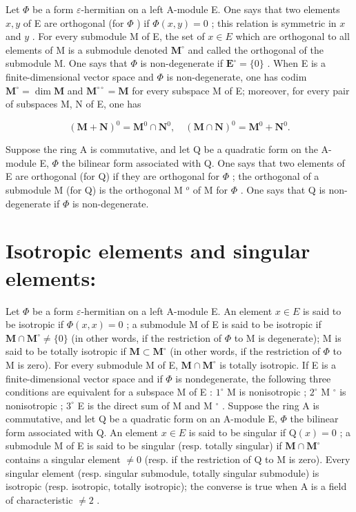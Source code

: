 Let \(\Phi\) be a form \(\varepsilon\)-hermitian on a left A-module E. One says that two elements \(x, y\) of E are orthogonal (for \(\Phi\) ) if \(\Phi(x, y) = 0\) ; this relation is symmetric in \(x\) and \(y\) . For every submodule M of E, the set of \(x \in E\) which are orthogonal to all elements of M is a submodule denoted \(\mathbf{M}^{\circ}\) and called the orthogonal of the submodule M. One says that \(\Phi\) is non-degenerate if \(\mathbf{E}^{\circ} = \{0\}\) . When E is a finite-dimensional vector space and \(\Phi\) is non-degenerate, one has codim \(\mathbf{M}^{\circ} = \dim \mathbf{M}\) and \(\mathbf{M}^{\circ\circ} = \mathbf{M}\) for every subspace M of E; moreover, for every pair of subspaces M, N of E, one has

\[
(\mathbf {M} + \mathbf {N}) ^ {0} = \mathbf {M} ^ {0} \cap \mathbf {N} ^ {0}, \quad (\mathbf {M} \cap \mathbf {N}) ^ {0} = \mathbf {M} ^ {0} + \mathbf {N} ^ {0}.
\]

Suppose the ring A is commutative, and let Q be a quadratic form on the A-module E, \(\Phi\) the bilinear form associated with Q. One says that two elements of E are orthogonal (for Q) if they are orthogonal for \(\Phi\) ; the orthogonal of a submodule M (for Q) is the orthogonal M \(^{o}\) of M for \(\Phi\) . One says that Q is non-degenerate if \(\Phi\) is non-degenerate.

\section*{Isotropic elements and singular elements:}

Let \(\Phi\) be a form \(\varepsilon\)-hermitian on a left A-module E. An element \(x \in E\) is said to be isotropic if \(\Phi(x, x) = 0\) ; a submodule M of E is said to be isotropic if \(\mathbf{M} \cap \mathbf{M}^{\circ} \neq \{0\}\) (in other words, if the restriction of \(\Phi\) to M is degenerate); M is said to be totally isotropic if \(\mathbf{M} \subset \mathbf{M}^{\circ}\) (in other words, if the restriction of \(\Phi\) to M is zero). For every submodule M of E, \(\mathbf{M} \cap \mathbf{M}^{\circ}\) is totally isotropic. If E is a finite-dimensional vector space and if \(\Phi\) is nondegenerate, the following three conditions are equivalent for a subspace M of E : \(1^{\circ}\) M is nonisotropic ; \(2^{\circ}\) M \(^{\circ}\) is nonisotropic ; \(3^{\circ}\) E is the direct sum of M and M \(^{\circ}\) . Suppose the ring A is commutative, and let Q be a quadratic form on an A-module E, \(\Phi\) the bilinear form associated with Q. An element \(x \in E\) is said to be singular if \(\mathrm{Q}(x) = 0\) ; a submodule M of E is said to be singular (resp. totally singular) if \(\mathbf{M} \cap \mathbf{M}^{\circ}\) contains a singular element \(\neq 0\) (resp. if the restriction of Q to M is zero). Every singular element (resp. singular submodule, totally singular submodule) is isotropic (resp. isotropic, totally isotropic); the converse is true when A is a field of characteristic \(\neq 2\) .
